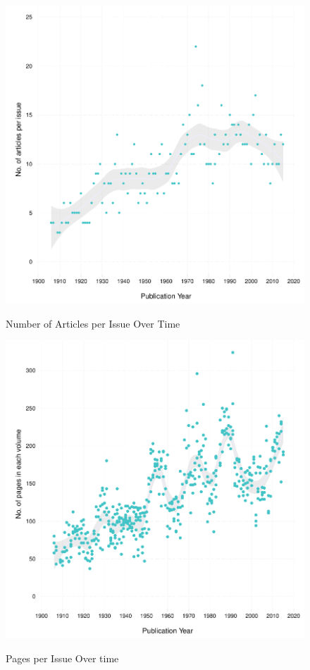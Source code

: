 \documentclass[11pt]{article}
\begin{document}
\begin{figure}[htbp]
\centering
\caption{Number of Articles per Issue Over Time}
\includegraphics[scale=.85]{../figs/articles_per_issue_over_time.pdf}
\label{fig:narticles}
\end{figure}

\begin{figure}[htbp]
\centering
\caption{Pages per Issue Over time}
\includegraphics[scale=.85]{../figs/pages_per_issue_over_time.pdf}
\label{fig:issue}
\end{figure}
\end{document}
